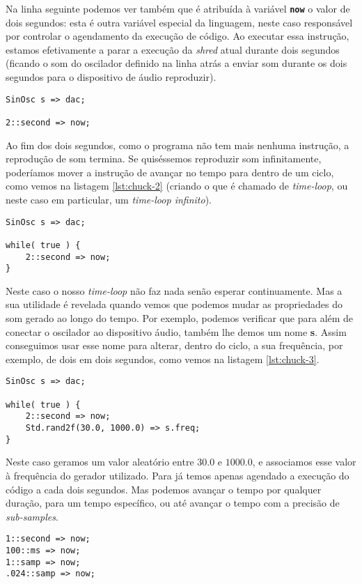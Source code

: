 Na linha seguinte podemos ver também que é atribuída à variável \textbf{\texttt{now}} o valor de dois segundos: esta é outra variável especial da linguagem, neste caso responsável por controlar o agendamento da execução de código. Ao executar essa instrução, estamos efetivamente a parar a execução da \textit{shred} atual durante dois segundos (ficando o som do oscilador definido na linha atrás a enviar som durante os dois segundos para o dispositivo de áudio reproduzir).
\begin{lstlisting}[caption={Reproduzir um oscilador durante dois segundos},label={lst:chuck-1}]
SinOsc s => dac;

2::second => now;
\end{lstlisting}

Ao fim dos dois segundos, como o programa não tem mais nenhuma instrução, a reprodução de som termina. Se quiséssemos reproduzir som infinitamente, poderíamos mover a instrução de avançar no tempo para dentro de um ciclo, como vemos na listagem \ref{lst:chuck-2} (criando o que é chamado de \textit{time-loop}, ou neste caso em particular, um \textit{time-loop infinito}).

\begin{lstlisting}[caption={Reproduzir um oscilador infinitamente},label={lst:chuck-2}]
SinOsc s => dac;

while( true ) {
    2::second => now;
}
\end{lstlisting}

Neste caso o nosso \textit{time-loop} não faz nada senão esperar continuamente. Mas a sua utilidade é revelada quando vemos que podemos mudar as propriedades do som gerado ao longo do tempo. Por exemplo, podemos verificar que para além de conectar o oscilador ao dispositivo áudio, também lhe demos um nome \textbf{s}. Assim conseguimos usar esse nome para alterar, dentro do ciclo, a sua frequência, por exemplo, de dois em dois segundos, como vemos na listagem \ref{lst:chuck-3}.
\begin{lstlisting}[caption={Reproduzir um oscilador, variando a frequência a cada 2 segundos},label={lst:chuck-3}]
SinOsc s => dac;

while( true ) {
    2::second => now;
    Std.rand2f(30.0, 1000.0) => s.freq;
}
\end{lstlisting}

Neste caso geramos um valor aleatório entre $30.0$ e $1000.0$, e associamos esse valor à frequência do gerador utilizado. Para já temos apenas agendado a execução do código a cada dois segundos. Mas podemos avançar o tempo por qualquer duração, para um tempo específico, ou até avançar o tempo com a precisão de \textit{sub-samples}.
\\
\begin{lstlisting}[caption={Exemplos de instruções de avanço no tempo},label={lst:chuck-4}]
1::second => now;
100::ms => now;
1::samp => now;
.024::samp => now;
\end{lstlisting}

